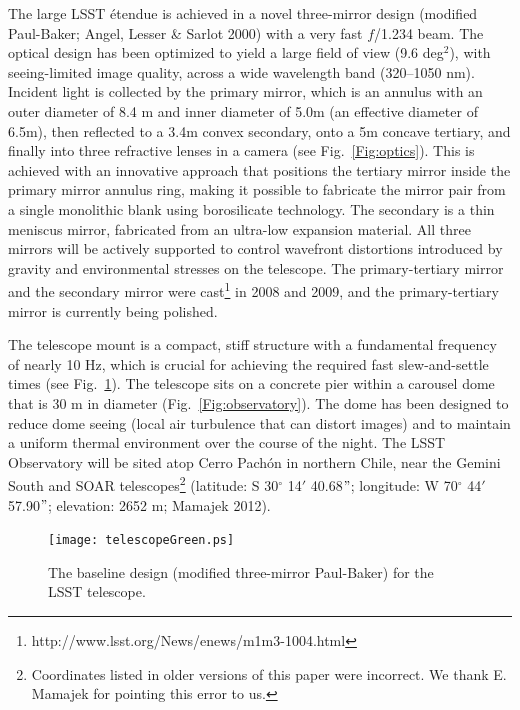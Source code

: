 \documentclass{emulateapj}
\begin{document}
The large LSST \'etendue is achieved in a novel three-mirror design (modified
Paul-Baker; Angel, Lesser \& Sarlot 2000) with a very fast $f$/1.234 beam. The optical 
design has been optimized to yield a large field of view (9.6 deg$^2$), 
with seeing-limited image quality, across a wide wavelength band (320--1050
nm). Incident light is collected by the primary mirror, which is an annulus
with an outer diameter of 8.4 m and inner diameter of 5.0m (an effective diameter of 
6.5m), then reflected to a 3.4m convex secondary, onto a 5m concave tertiary, and finally 
into three refractive lenses in a camera (see Fig.~\ref{Fig:optics}). This is achieved 
with an innovative approach that positions the tertiary mirror inside the primary 
mirror annulus ring, making it possible to fabricate the mirror pair from a 
single monolithic blank using borosilicate technology. The secondary is 
a thin meniscus mirror, fabricated from an ultra-low expansion material. All 
three mirrors will be actively supported to control wavefront distortions 
introduced by gravity and environmental stresses on the telescope. 
The primary-tertiary mirror and the secondary mirror were 
cast\footnote{http://www.lsst.org/News/enews/m1m3-1004.html}  in 2008 and 2009,
and the primary-tertiary mirror is currently being polished. 

The telescope mount is a compact, stiff structure with a fundamental frequency of 
nearly 10 Hz, which is crucial for achieving the required fast slew-and-settle times
(see Fig.~\ref{Fig:telescope}). The telescope sits on a concrete pier within a 
carousel dome that is 30 m in diameter (Fig.~\ref{Fig:observatory}). The dome has 
been designed to reduce dome seeing (local air turbulence that can distort images) 
and to maintain a uniform thermal environment over the course of the night. 
The LSST Observatory will be sited atop Cerro Pach\'{o}n in northern Chile,
near the Gemini South and SOAR telescopes\footnote{Coordinates listed in older versions 
of this paper were incorrect. We thank E. Mamajek for pointing this error to us.} 
(latitude: S 30$^\circ$ 14$'$ 40.68$"$; longitude: W 70$^\circ$ 44$'$ 57.90$"$; elevation: 2652 m; 
Mamajek 2012).


\begin{figure}
\vskip -0.65in
\texttt{[image: telescopeGreen.ps]}
\vskip -0.65in
\caption{The baseline design (modified three-mirror Paul-Baker) for the 
LSST telescope.} 
\label{Fig:telescope}
\end{figure}
\end{document}
